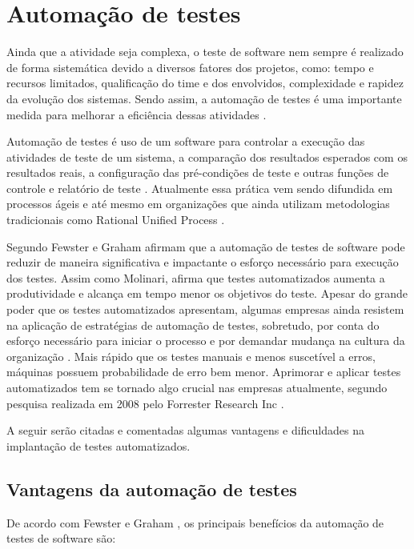 \section{Automação de testes}

Ainda que a atividade seja complexa, o teste de software nem sempre é realizado de forma sistemática devido a diversos fatores dos projetos, como: tempo e recursos limitados, qualificação do time e dos envolvidos, complexidade e rapidez da evolução dos sistemas. Sendo assim, a automação de testes é uma importante medida para melhorar a eficiência dessas atividades \cite{Fantinato2004}.

Automação de testes é uso de um software para controlar a execução das atividades de teste de um sistema, a comparação dos resultados esperados com os resultados reais, a configuração das pré-condições de teste e outras funções de controle e relatório de teste \cite{Hooda2012}. Atualmente essa prática vem sendo difundida em processos ágeis e até mesmo em organizações que ainda utilizam metodologias tradicionais como Rational Unified Process \cite{Lima2012}.
	
Segundo Fewster e Graham \cite{Fewster1999} afirmam que a automação de testes de software pode reduzir de maneira significativa e impactante o esforço necessário para execução dos testes. Assim como Molinari\cite{Molinari2010}, afirma que testes automatizados aumenta a produtividade e alcança em tempo menor os objetivos do teste. Apesar do grande poder que os testes automatizados apresentam, algumas empresas ainda resistem na aplicação de estratégias de automação de testes, sobretudo, por conta do esforço necessário para iniciar o processo e por demandar mudança na cultura da organização \cite{Lima2012}. Mais rápido que os testes manuais e menos suscetível a erros, máquinas possuem probabilidade de erro bem menor. Aprimorar e aplicar testes automatizados tem se tornado algo crucial nas empresas atualmente, segundo pesquisa realizada em 2008 pelo Forrester Research Inc \cite{Forrester2008}.

A seguir serão citadas e comentadas algumas vantagens e dificuldades na implantação de testes automatizados.

\subsection{Vantagens da automação de testes}

De acordo com Fewster e Graham \cite{Fewster1999}, os principais benefícios da automação de testes de software são:

